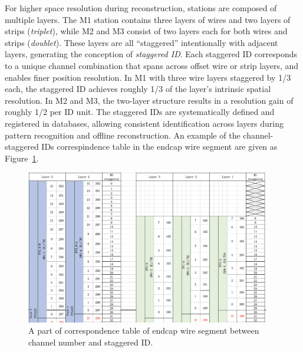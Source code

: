 For higher space resolution during reconstruction, stations are composed of multiple layers. The M1 station contains three layers of wires and two layers of strips (\textit{triplet}), while M2 and M3 consist of two layers each for both wires and strips (\textit{doublet}). These layers are all ``staggered'' intentionally with adjacent layers, generating the conception of \textit{staggered ID}. Each staggered ID corresponds to a unique channel combination that spans across offset wire or strip layers, and enables finer position resolution. In M1 with three wire layers staggered by 1/3 each, the staggered ID achieves roughly 1/3 of the layer's intrinsic spatial resolution. In M2 and M3, the two-layer structure results in a resolution gain of roughly 1/2 per ID unit. The staggered IDs are systematically defined and registered in databases, allowing consistent identification across layers during pattern recognition and offline reconstruction. An example of the channel-staggered IDs correspindence table in the endcap wire segment are given as Figure~\ref{fig:staggeredID}.

\begin{figure}[htbp]
  \centering
  \includegraphics[width=0.95\textwidth]{figs/chapter2/staggeredID_small.png}
  \caption{A part of correspondence table of endcap wire segment between channel number and staggered ID.}
  \label{fig:staggeredID}
\end{figure}

